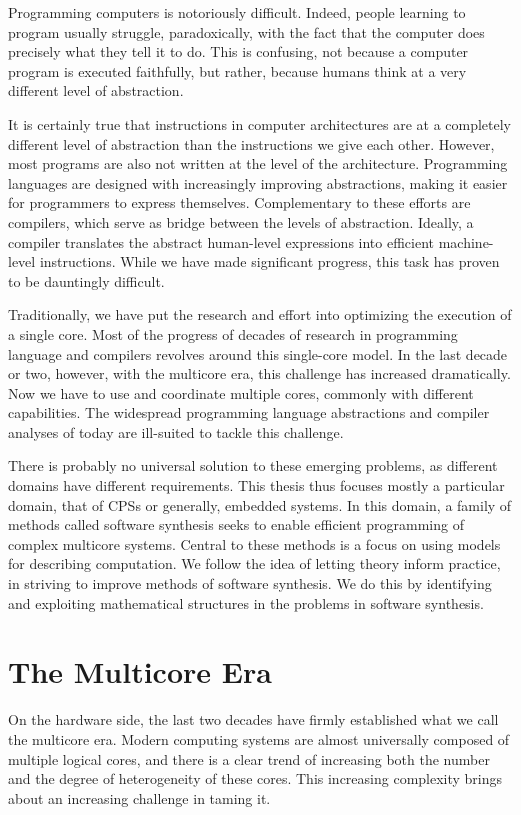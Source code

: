 Programming computers is notoriously difficult.
Indeed, people learning to program usually struggle, paradoxically, with the fact that the computer does precisely what they tell it to do. 
This is confusing, not because a computer program is executed faithfully, but rather, because humans think at a very different level of abstraction.

It is certainly true that instructions in computer architectures are at a completely different level of abstraction than the instructions we give each other.
However, most programs are also not written at the level of the architecture.
Programming languages are designed with increasingly improving abstractions, making it easier for programmers to express themselves.
Complementary to these efforts are compilers, which serve as bridge between the levels of abstraction.
Ideally, a compiler translates the abstract human-level expressions into efficient machine-level instructions.
While we have made significant progress, this task has proven to be dauntingly difficult.

Traditionally, we have put the research and effort into optimizing the execution of a single core.
Most of the progress of decades of research in programming language and compilers revolves around this single-core model.
In the last decade or two, however, with the multicore era, this challenge has increased dramatically.
Now we have to use and coordinate multiple cores, commonly with different capabilities.
The widespread programming language abstractions and compiler analyses of today are ill-suited to tackle this challenge.

There is probably no universal solution to these emerging problems, as different domains have different requirements.
This thesis thus focuses mostly a particular domain, that of \acfp{CPS} or generally, embedded systems.
In this domain, a family of methods called software synthesis seeks to enable efficient programming of complex multicore systems.
Central to these methods is a focus on using models for describing computation.
We follow the idea of letting theory inform practice, in striving to improve methods of software synthesis.
We do this by identifying and exploiting mathematical structures in the problems in software synthesis.

\section{The Multicore Era}

On the hardware side, the last two decades have firmly established what we call the multicore era.
Modern computing systems are almost universally composed of multiple logical cores, and there is a clear trend of increasing both the number and the degree of heterogeneity of these cores.
This increasing complexity brings about an increasing challenge in taming it.

